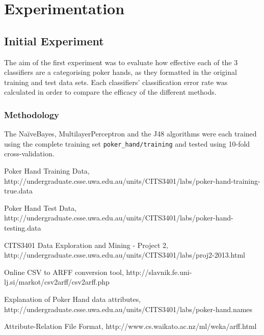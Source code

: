 \documentclass[11pt, a4paper]{article}
\begin{document}
\section*{Experimentation}

\subsection*{Initial Experiment}


The aim of the first experiment was to evaluate how effective each of the 3 classifiers are a categorising poker hands, as they formatted in the original training and test data sets. Each classifiers' classification error rate was calculated in order to compare the efficacy of the different methods.

\subsubsection*{Methodology}

The Na\"iveBayes, MultilayerPerceptron and the J48 algorithms were each trained using the complete training set \texttt{poker\_hand/training} and tested using 10-fold cross-validation.

\begin{thebibliography}{9}

	Poker Hand Training Data,	
	http://undergraduate.csse.uwa.edu.au/units/CITS3401/labs/poker-hand-training-true.data
	
	Poker Hand Test Data,	
	http://undergraduate.csse.uwa.edu.au/units/CITS3401/labs/poker-hand-testing.data
	
	CITS3401 Data Exploration and Mining - Project 2,
	http://undergraduate.csse.uwa.edu.au/units/CITS3401/labs/proj2-2013.html

	Online CSV to ARFF conversion tool,
	http://slavnik.fe.uni-lj.si/markot/csv2arff/csv2arff.php

	Explanation of Poker Hand data attributes,
	http://undergraduate.csse.uwa.edu.au/units/CITS3401/labs/poker-hand.names

	Attribute-Relation File Format,
	http://www.cs.waikato.ac.nz/ml/weka/arff.html

\end{thebibliography}


\end{document}
